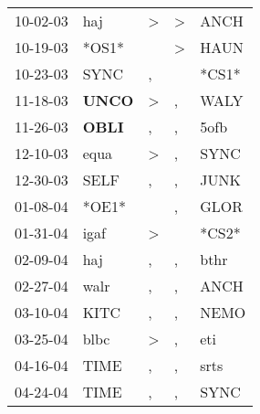 \begin{supertabular}{p{0.07\textwidth}p{0.06\textwidth}p{0.02\textwidth}p{0.02\textwidth}p{0.06\textwidth}}
          10-02-03\textsuperscript{} &            haj\textsuperscript{} &     \textgreater &  \textgreater &           ANCH\textsuperscript{} \\
          10-19-03\textsuperscript{} &                            *OS1* &                  &  \textgreater &           HAUN\textsuperscript{} \\
          10-23-03\textsuperscript{} &           SYNC\textsuperscript{} &                , &               &                            *CS1* \\
          11-18-03\textsuperscript{} &  \textbf{UNCO\textsuperscript{}} &     \textgreater &             , &           WALY\textsuperscript{} \\
          11-26-03\textsuperscript{} &  \textbf{OBLI\textsuperscript{}} &                , &             , &           5ofb\textsuperscript{} \\
          12-10-03\textsuperscript{} &           equa\textsuperscript{} &     \textgreater &             , &           SYNC\textsuperscript{} \\
          12-30-03\textsuperscript{} &           SELF\textsuperscript{} &                , &             , &           JUNK\textsuperscript{} \\
          01-08-04\textsuperscript{} &                            *OE1* &                  &             , &           GLOR\textsuperscript{} \\
          01-31-04\textsuperscript{} &           igaf\textsuperscript{} &     \textgreater &               &                            *CS2* \\
          02-09-04\textsuperscript{} &            haj\textsuperscript{} &                , &             , &           bthr\textsuperscript{} \\
          02-27-04\textsuperscript{} &           walr\textsuperscript{} &                , &             , &           ANCH\textsuperscript{} \\
          03-10-04\textsuperscript{} &           KITC\textsuperscript{} &                , &             , &           NEMO\textsuperscript{} \\
          03-25-04\textsuperscript{} &           blbc\textsuperscript{} &     \textgreater &             , &            eti\textsuperscript{} \\
          04-16-04\textsuperscript{} &           TIME\textsuperscript{} &                , &             , &           srts\textsuperscript{} \\
          04-24-04\textsuperscript{} &           TIME\textsuperscript{} &                , &             , &           SYNC\textsuperscript{} \\

\end{supertabular}
